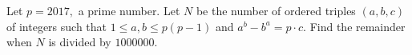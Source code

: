 Let $p = 2017,$ a prime number. Let $N$ be the number of ordered triples $(a,b,c)$ of integers such that $1 \le a,b \le p(p-1)$ and $a^b-b^a=p \cdot c$. Find the remainder when $N$ is divided by $1000000.$
